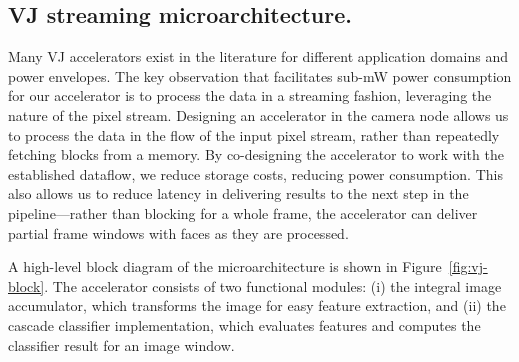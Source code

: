 \subsection{VJ streaming microarchitecture.}
Many VJ accelerators exist in the literature for different application domains and power envelopes.
The key observation that facilitates sub-mW power consumption for our accelerator is to process the data in a streaming fashion, leveraging the nature of the pixel stream.
Designing an accelerator in the camera node allows us to process the data in the flow of the input pixel stream, rather than repeatedly fetching blocks from a memory.
By co-designing the accelerator to work with the established dataflow, we reduce storage costs, reducing power consumption.
This also allows us to reduce latency in delivering results to the next step in the pipeline---rather than blocking for a whole frame, the accelerator can deliver partial frame windows with faces as they are processed.

A high-level block diagram of the microarchitecture is shown in Figure~\ref{fig:vj-block}. The accelerator consists of two functional modules: (i) the integral image accumulator, which transforms the image for easy feature extraction, and (ii) the cascade classifier implementation, which evaluates features and computes the classifier result for an image window.

